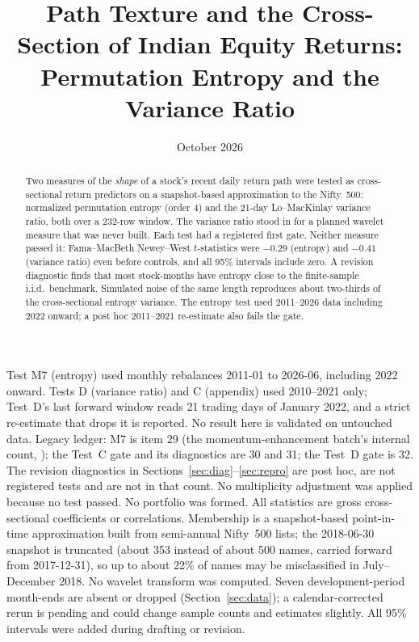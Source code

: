 \documentclass[11pt]{article}
\title{Path Texture and the Cross-Section of Indian Equity Returns:\\
Permutation Entropy and the Variance Ratio}
\author{\authorline}
\date{October 2026}
\begin{document}
\maketitle

\begin{abstract}
\noindent Two measures of the \emph{shape} of a stock's recent daily return path were
tested as cross-sectional return predictors on a snapshot-based approximation to the
Nifty~500: normalized permutation entropy (order 4) and the 21-day Lo--MacKinlay
variance ratio, both over a 232-row window. The variance ratio stood in for a planned
wavelet measure that was never built. Each test had a registered first gate. Neither
measure passed it: Fama--MacBeth Newey--West $t$-statistics were $-0.29$ (entropy) and
$-0.41$ (variance ratio) even before controls, and all 95\% intervals include zero. A
revision diagnostic finds that most stock-months have entropy close to the finite-sample
i.i.d.\ benchmark. Simulated noise of the same length reproduces about two-thirds of the
cross-sectional entropy variance. The entropy test used 2011--2026 data including 2022
onward; a post hoc 2011--2021 re-estimate also fails the gate.
\end{abstract}

\caveatsbox
{Test M7 (entropy) used monthly rebalances 2011-01 to 2026-06, including 2022 onward.
Tests D (variance ratio) and C (appendix) used 2010--2021 only; Test~D's last forward
window reads 21 trading days of January 2022, and a strict re-estimate that drops it is
reported. No result here is validated on untouched data.}
{Legacy ledger: M7 is item 29 (the momentum-enhancement batch's internal count,
\citet{sahi_momentum}); the Test~C gate and its diagnostics are 30 and 31; the Test~D gate
is 32. The revision diagnostics in Sections~\ref{sec:diag}--\ref{sec:repro} are post hoc,
are not registered tests and are not in that count. No multiplicity adjustment was
applied because no test passed.}
{No portfolio was formed. All statistics are gross cross-sectional coefficients or
correlations.}
{Membership is a snapshot-based point-in-time approximation built from semi-annual
Nifty~500 lists; the 2018-06-30 snapshot is truncated (about 353 instead of about 500
names, carried forward from 2017-12-31), so up to about 22\% of names may be
misclassified in July--December 2018.}
{No wavelet transform was computed. Seven development-period month-ends are absent or
dropped (Section~\ref{sec:data}); a calendar-corrected rerun is pending and could change
sample counts and estimates slightly. All 95\% intervals were added during drafting or
revision.}
\end{document}
